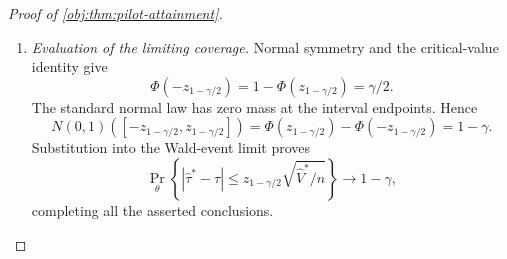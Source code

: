 \begin{proof}[Proof of \cref{obj:thm:pilot-attainment}]
\begin{enumerate}
For each fixed pilot, product normalization and the exact correction mean give
\[
\begin{aligned}
&\sum_{\mathbf s\in\mathcal S^{N_n}}
\left(\prod_{j=1}^{N_n}
\omega_{\theta,\vartheta_n(\mathbf r)}(s_j)\right)
\left\{
c^\top\vartheta_n(\mathbf r)
+\frac1{N_n}\sum_{j=1}^{N_n}
\phi_{\vartheta_n(\mathbf r)}(s_j)
-c^\top\theta
\right\}\\
&\hspace{2cm}
=c^\top\vartheta_n(\mathbf r)
+\frac{N_n}{N_n}
c^\top(\theta-\vartheta_n(\mathbf r))
-c^\top\theta
=0.
\end{aligned}
\]
Multiplication by \(w_{n,0}(\mathbf r)\) shows that the integral of
\(\widehat\tau^*-\tau\) over every pilot-prefix cell is zero. A prefix incompatible with the pilot release type has zero mass, so its cell integral is also zero.

A function \(f\) satisfying the statement is constant on each such cell. Summing the zero cell integrals, each multiplied by its corresponding value of \(f\), gives
\[
\mathbb E_\theta[(\widehat\tau^*-\tau)f]=0.
\]
The transcript space is finite and the estimator and \(f\) are real-valued, so their product is integrable under the transcript probability law.

\item \emph{Evaluation of the limiting coverage.}
Normal symmetry and the critical-value identity give
\[
\Phi(-z_{1-\gamma/2})
=1-\Phi(z_{1-\gamma/2})
=\gamma/2.
\]
The standard normal law has zero mass at the interval endpoints. Hence
\[
N(0,1)([-z_{1-\gamma/2},z_{1-\gamma/2}])
=
\Phi(z_{1-\gamma/2})-\Phi(-z_{1-\gamma/2})
=
1-\gamma.
\]
Substitution into the Wald-event limit proves
\[
\Pr_\theta\left\{
|\widehat\tau^*-\tau|
\le z_{1-\gamma/2}\sqrt{\widehat V^*/n}
\right\}\longrightarrow1-\gamma,
\]
completing all the asserted conclusions.
\end{enumerate}
\end{proof}


